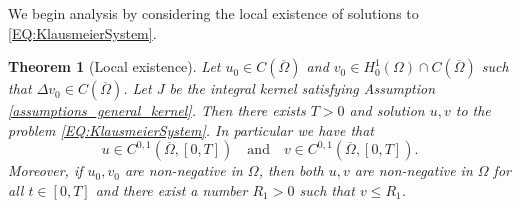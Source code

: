 \documentclass[12pt, a4paper]{article}
\theoremstyle{break}
\newtheorem{thm}{Theorem}[section]
\theoremstyle{break}
\theoremstyle{break}
\theoremstyle{break}
\theoremstyle{break}
\theoremstyle{break}
\theoremstyle{break}
\begin{document}
We begin analysis by considering the local existence of solutions to \eqref{EQ:KlausmeierSystem}.

\begin{thm}[Local existence]
    \label{thm:Well-Posedness}
    Let $u_0 \in C(\overline{\Omega})$ and $v_0 \in H^1_0(\Omega)\cap C(\overline{\Omega})$ such that $\Delta v_0 \in C(\overline{\Omega})$. Let $J$ be the integral kernel satisfying Assumption \ref{assumptions_general_kernel}. Then there exists $T > 0$ and solution $u, v$ to the problem \eqref{EQ:KlausmeierSystem}. In particular we have that
    \begin{equation}
        u \in C^{0, 1}(\overline{\Omega}, [0, T]) \quad \text{and} \quad v \in C^{0, 1}(\overline{\Omega}, [0, T]).
    \end{equation}
    Moreover, if $u_0, v_0$ are non-negative in $\Omega$, then both $u, v$ are non-negative in $\Omega$ for all $t \in [0, T]$ and there exist a number $R_1 > 0$ such that $v \leq R_1$.
\end{thm}
\end{document}
